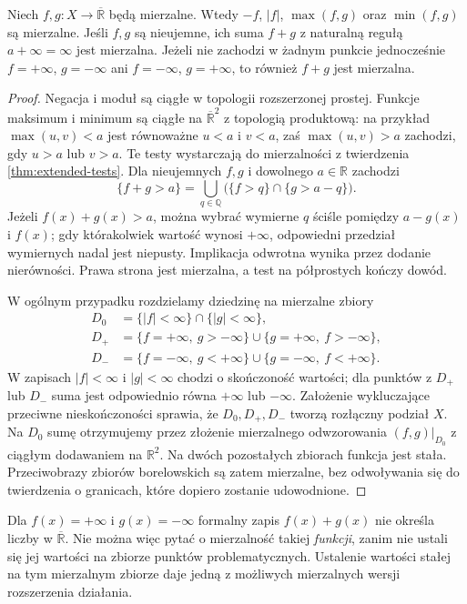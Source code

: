 \begin{twierdzenie}
\label{thm:extended-operations}
Niech $f,g:X\to\overline{\mathbb R}$ będą mierzalne.
Wtedy $-f$, $|f|$, $\max(f,g)$ oraz $\min(f,g)$
są mierzalne. Jeśli $f,g$ są nieujemne, ich suma
$f+g$ z naturalną regułą $a+\infty=\infty$
jest mierzalna. Jeżeli nie zachodzi w żadnym punkcie
jednocześnie $f=+\infty$, $g=-\infty$ ani
$f=-\infty$, $g=+\infty$, to również $f+g$ jest mierzalna.
\end{twierdzenie}
\begin{proof}
Negacja i moduł są ciągłe w topologii rozszerzonej
prostej. Funkcje maksimum i minimum są ciągłe na
$\overline{\mathbb R}^2$ z topologią produktową:
na przykład $\max(u,v)<a$ jest równoważne
$u<a$ i $v<a$, zaś $\max(u,v)>a$ zachodzi,
gdy $u>a$ lub $v>a$. Te testy wystarczają do
mierzalności z twierdzenia \ref{thm:extended-tests}.
Dla nieujemnych $f,g$ i dowolnego $a\in\mathbb R$
zachodzi
\[
\{f+g>a\}=\bigcup_{q\in\mathbb Q}
\bigl(\{f>q\}\cap\{g>a-q\}\bigr).
\]
Jeżeli $f(x)+g(x)>a$, można wybrać wymierne $q$
ściśle pomiędzy $a-g(x)$ i $f(x)$; gdy którakolwiek
wartość wynosi $+\infty$, odpowiedni przedział
wymiernych nadal jest niepusty. Implikacja odwrotna
wynika przez dodanie nierówności. Prawa strona
jest mierzalna, a test na półprostych kończy dowód.

W ogólnym przypadku rozdzielamy dziedzinę na mierzalne
zbiory
\[
\begin{aligned}
D_0&=\{|f|<\infty\}\cap\{|g|<\infty\},\\
D_+&=\{f=+\infty,\ g>-\infty\}
      \cup\{g=+\infty,\ f>-\infty\},\\
D_-&=\{f=-\infty,\ g<+\infty\}
      \cup\{g=-\infty,\ f<+\infty\}.
\end{aligned}
\]
W zapisach $|f|<\infty$ i $|g|<\infty$ chodzi o
skończoność wartości; dla punktów z $D_+$ lub $D_-$
suma jest odpowiednio równa $+\infty$ lub $-\infty$.
Założenie wykluczające przeciwne nieskończoności
sprawia, że $D_0,D_+,D_-$ tworzą rozłączny podział
$X$. Na $D_0$ sumę otrzymujemy przez złożenie
mierzalnego odwzorowania $(f,g)|_{D_0}$ z ciągłym
dodawaniem na $\mathbb R^2$. Na dwóch pozostałych
zbiorach funkcja jest stała. Przeciwobrazy
zbiorów borelowskich są zatem mierzalne, bez
odwoływania się do twierdzenia o granicach,
które dopiero zostanie udowodnione.
\end{proof}

\begin{uwaga}
Dla $f(x)=+\infty$ i $g(x)=-\infty$ formalny zapis
$f(x)+g(x)$ nie określa liczby w $\overline{\mathbb R}$.
Nie można więc pytać o mierzalność takiej \emph{funkcji},
zanim nie ustali się jej wartości na zbiorze punktów
problematycznych. Ustalenie wartości stałej na tym
mierzalnym zbiorze daje jedną z możliwych mierzalnych
wersji rozszerzenia działania.
\end{uwaga}

